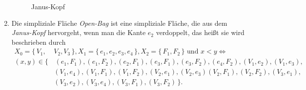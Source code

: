 \documentclass[12pt,titlepage]{article}
\begin{document}
\begin{bsp}
\begin{enumerate}
\begin{figure}[h]
\begin{tikzpicture}[line cap=round,line join=round,>=triangle 45,x=1.0cm,y=1.0cm]
\end{tikzpicture}
\caption{Janus-Kopf}
\end{figure}
 \item 
 Die simpliziale Fläche \emph{Open-Bag} ist eine simpliziale Fläche, die aus dem \emph{Janus-Kopf} hervorgeht, wenn man die Kante $e_{2}$ verdoppelt, das heißt sie wird beschrieben durch
 \begin{align*}
  X_{0}=\{\,V_{1},&V_{2},V_{3}\,\},X_{1}=\{\,e_{1},e_{2},e_{3},e_{4} \,\}, X_{2}=\{\,F_{1},F_{2}\,\} \text{ und } x<y \Leftrightarrow\\
 (x,y)\in\{&\,(e_{1},F_{1}),(e_{1},F_{2}),(e_{2},F_{1}),(e_{3},F_{1}),(e_{3},F_{2}),(e_{4},F_{2}),(V_{1},e_{2}),(V_{1},e_{3}),\\ &(V_{1},e_{4}),
  (V_{1},F_{1}),(V_{1},F_{2}),(V_{2},e_{1}),(V_{2},e_{3})
 (V_{2},F_{1}), (V_{2},F_{2}), (V_{3},e_{1}),\\&(V_{3},e_{2}),(V_{3},e_{4}),(V_{3},F_{1}),(V_3,F_2) \,\}.
 \end{align*}
 \end{enumerate}
\begin{figure}[h]
\begin{tikzpicture}[line cap=round,line join=round,>=triangle 45,x=1.0cm,y=1.0cm]


\end{tikzpicture}
\end{figure}
\end{bsp}
\end{document}
